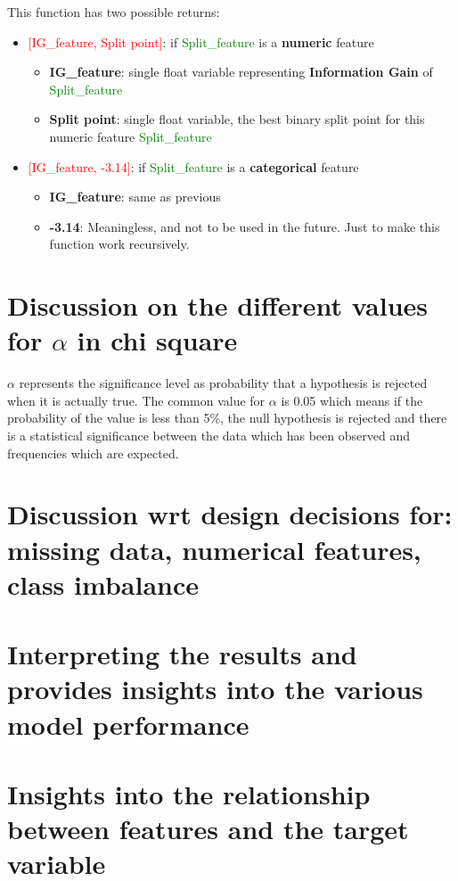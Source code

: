 \documentclass{article}
\begin{document}
This function has two possible returns: 

\begin{itemize}
    \item \textcolor{red}{[IG\_feature, Split point]}: if \textcolor{green}{Split\_feature} is a \textbf{numeric} feature
        \begin{itemize}
            \item \textbf{IG\_feature}: single float variable representing \textbf{Information Gain} of \textcolor{green}{Split\_feature}
            \item \textbf{Split point}: single float variable, the best binary split point for this numeric feature \textcolor{green}{Split\_feature}
        \end{itemize}
    \item \textcolor{red}{[IG\_feature, -3.14]}: if \textcolor{green}{Split\_feature} is a \textbf{categorical} feature
        \begin{itemize}
            \item \textbf{IG\_feature}: same as previous
            \item \textbf{-3.14}: Meaningless, and not to be used in the future. Just to make this function work recursively.
        \end{itemize}
\end{itemize}


\section{Discussion on the different values for $\alpha$ in chi square}

$\alpha$ represents the significance level as probability that a hypothesis is rejected when it is actually true. The common value for $\alpha$ is 0.05 which means if the probability of the value is less than 5\%, the null hypothesis is rejected and there is a statistical significance between the data which has been observed and frequencies which are expected.



\section{Discussion wrt design decisions for: missing data, numerical features, class imbalance}
\section{Interpreting the results and provides insights into the various model performance}
\section{Insights into the relationship between features and the target variable}
\end{document}
